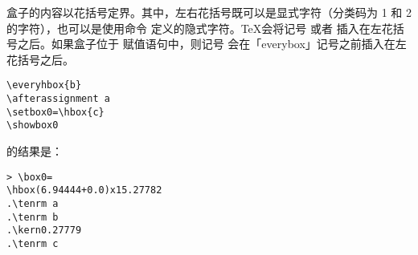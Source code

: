 \documentclass{book}
\begin{document}
盒子的内容以花括号定界。其中，左右花括号既可以是显式字符（分类码为 1 和 2 的字符），也可以是使用命令  定义的隐式字符。\TeX 会将记号  或者  插入在左花括号之后。如果盒子位于  赋值语句中，则记号  会在「everybox」记号之前插入在左花括号之后。


\begin{example} \label{every:box:assign}
\begin{verbatim}
\everyhbox{b}
\afterassignment a
\setbox0=\hbox{c}
\showbox0
\end{verbatim}
的结果是：
\begin{verbatim}
> \box0=
\hbox(6.94444+0.0)x15.27782
.\tenrm a
.\tenrm b
.\kern0.27779
.\tenrm c
\end{verbatim}
\end{example}
\end{document}
